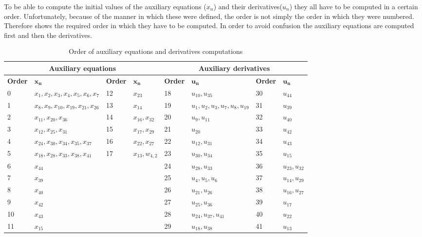 To be able to compute the initial values of the auxiliary equations ($x_{n}$) and their derivatives($u_{n}$) they all have to be computed in a certain order. Unfortunately, because of the manner in which these were defined, the order is not simply the order in which they were numbered. Therefore  shows the required order in which they have to be computed. In order to avoid confusion the auxiliary equations are computed first and then the derivatives.

\begin{table}[!ht]
\begin{center}
\caption{Order of auxiliary equations and derivatives computations}
\label{tab:calcOrderAuxEq}
\begin{tabular}{|l|l||l|l||l|l||l|l|}
\hline 
\multicolumn{4}{c}{\textbf{Auxiliary equations}} & \multicolumn{4}{c}{\textbf{Auxiliary derivatives}} \\ \hline \hline
\textbf{Order} & $\mathbf{x_{n}}$ &\textbf{Order} & $\mathbf{x_{n}}$ & \textbf{Order} & $\mathbf{u_{n}}$ & \textbf{Order} & $\mathbf{u_{n}}$ \\ \hline 
0 & $ x_{1}, x_{2}, x_{3}, x_{4}, x_{5}, x_{6}, x_{7} $ & 12 & $ x_{23} $ & 18 & $ u_{10}, u_{35} $ & 30 & $ u_{44} $ \\ \hline
1 & $ x_{8}, x_{9}, x_{10}, x_{19}, x_{21}, x_{26} $ & 13 & $ x_{14} $ & 19 & $ u_{1}, u_{2}, u_{3}, u_{7}, u_{8}, u_{19} $ & 31 & $ u_{39} $ \\ \hline
2 & $ x_{11}, x_{20}, x_{36} $ & 14 & $ x_{16}, x_{32} $ & 20 & $ u_{9}, u_{11} $ & 32 & $ u_{40} $ \\ \hline
3 & $ x_{12}, x_{25}, x_{31} $ & 15 & $ x_{17}, x_{29} $ & 21 & $ u_{20} $ & 33 & $ u_{42} $ \\ \hline
4 & $ x_{24}, x_{30}, x_{34}, x_{35}, x_{37}  $ & 16 & $ x_{22}, x_{27} $ & 22 & $ u_{12}, u_{31} $ & 34 & $ u_{43} $ \\ \hline
5 & $ x_{18}, x_{28}, x_{33}, x_{38}, x_{41} $ & 17 & $ x_{13}, w_{4,2}$ & 23 & $ u_{30}, u_{34} $ & 35 & $ u_{15} $ \\ \hline
6 & $ x_{44} $ &  & & 24 & $ u_{28}, u_{33} $ & 36 & $ u_{23}, u_{32} $ \\ \hline
7 & $ x_{39} $ & & & 25 & $ u_{4}, u_{5}, u_{6} $ & 37 & $ u_{14}, u_{29} $ \\ \hline
8 & $ x_{40} $ & & & 26 & $ u_{21}, u_{26} $ & 38 & $ u_{16}, u_{27} $ \\ \hline
9 & $ x_{42} $ & & & 27 & $ u_{25}, u_{36} $ & 39 & $ u_{17} $ \\ \hline
10 & $ x_{43} $ & & & 28 & $ u_{24}, u_{37}, u_{41}  $ & 40 & $ u_{22} $ \\ \hline
11 & $ x_{15} $ & & & 29 & $ u_{18}, u_{38} $ & 41 & $ u_{13} $ \\ \hline
\end{tabular}
\end{center}
\end{table}

